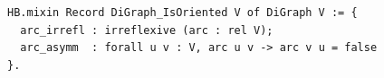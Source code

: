 \begin{lstlisting}[language=Rocq]
HB.mixin Record DiGraph_IsOriented V of DiGraph V := {
  arc_irrefl : irreflexive (arc : rel V);
  arc_asymm  : forall u v : V, arc u v -> arc v u = false
}.
\end{lstlisting}
